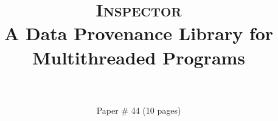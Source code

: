 \documentclass{IEEEtran}
\newcommand{\myfontsize}{\fontsize{7}{9}\selectfont}
\newcommand{\myreffontsize}{\fontsize{8.5}{9.5}\selectfont}
\newcommand{\projecttitle}{\textsc{Inspector}\xspace}
\begin{document}
\author{
\\
\\
Paper \# 44 (10 pages)
}

\title{\huge \projecttitle\\A Data Provenance Library for Multithreaded Programs}
\maketitle

















\vspace{-3mm}
\footnotesize


 
\end{document}
